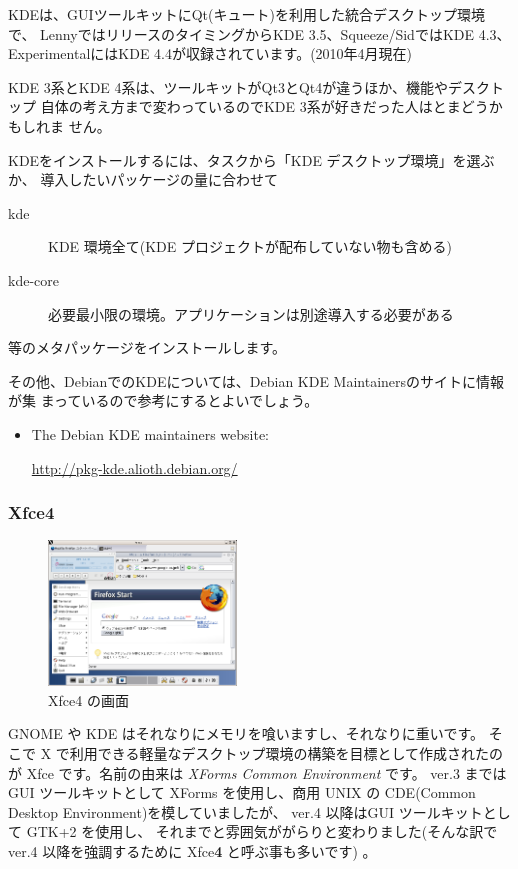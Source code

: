 \documentclass[mingoth,a4paper]{jsarticle}
\begin{document}
KDEは、GUIツールキットにQt(キュート)を利用した統合デスクトップ環境で、
LennyではリリースのタイミングからKDE 3.5、Squeeze/SidではKDE 4.3、
ExperimentalにはKDE 4.4が収録されています。(2010年4月現在)

KDE 3系とKDE 4系は、ツールキットがQt3とQt4が違うほか、機能やデスクトップ
自体の考え方まで変わっているのでKDE 3系が好きだった人はとまどうかもしれま
せん。

KDEをインストールするには、タスクから「KDE デスクトップ環境」を選ぶか、
導入したいパッケージの量に合わせて
\begin{description}
      \item[kde]
    KDE 環境全て(KDE プロジェクトが配布していない物も含める)
      \item[kde-core]
    必要最小限の環境。アプリケーションは別途導入する必要がある
\end{description}
等のメタパッケージをインストールします。

その他、DebianでのKDEについては、Debian KDE Maintainersのサイトに情報が集
まっているので参考にするとよいでしょう。

\begin{itemize}
 \item The Debian KDE maintainers website:

       \url{http://pkg-kde.alioth.debian.org/}

\end{itemize}

\subsubsection{Xfce4}
\begin{figure}
 \begin{center}
  \includegraphics[width=5cm]{image201004/xfce4.png}
  \caption{Xfce4 の画面}
 \end{center}
\end{figure}


GNOME や KDE はそれなりにメモリを喰いますし、それなりに重いです。
そこで X で利用できる軽量なデスクトップ環境の構築を目標として作成されたのが
Xfce です。名前の由来は {\it XForms Common Environment} です。
ver.3 までは GUI ツールキットとして XForms を使用し、商用 UNIX の CDE(Common Desktop Environment)を模していましたが、
ver.4 以降はGUI ツールキットとして GTK+2 を使用し、
それまでと雰囲気ががらりと変わりました(そんな訳で ver.4 以降を強調するために Xfce{\bf 4} と呼ぶ事も多いです) 。
\end{document}

